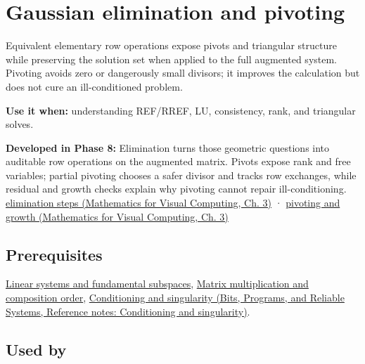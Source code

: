 \hypertarget{appendix-f6e77f4a200f}{}\label{referencestart:appendix-f6e77f4a200f}
\section{Gaussian elimination and pivoting}\label{appendix-f6e77f4a200f-gaussian-elimination-and-pivoting}

\hypertarget{appendix-f6e77f4a200f-gaussian-elimination-and-pivoting}{}

Equivalent elementary row operations expose pivots and triangular structure while preserving the solution set when applied to the full augmented system. Pivoting avoids zero or dangerously small divisors; it improves the calculation but does not cure an ill-conditioned problem.

\textbf{Use it when:} understanding REF/RREF, LU, consistency, rank, and triangular solves.

\textbf{Developed in Phase 8:} Elimination turns those geometric questions into auditable row operations on the augmented matrix. Pivots expose rank and free variables; partial pivoting chooses a safer divisor and tracks row exchanges, while residual and growth checks explain why pivoting cannot repair ill-conditioning. \href{../02-Mathematics-for-Visual-Computing/main.pdf\#nameddest=01-foundations-i-ch019-elimination-turns-the-geometry-into-an-auditable-calculation}{elimination steps (Mathematics for Visual Computing, Ch. 3)} · \href{../02-Mathematics-for-Visual-Computing/main.pdf\#nameddest=01-foundations-i-ch019-pivoting-separates-algorithm-failure-from-matrix-failure}{pivoting and growth (Mathematics for Visual Computing, Ch. 3)}

\subsection{Prerequisites}\label{appendix-f6e77f4a200f-prerequisites}

\hypertarget{appendix-f6e77f4a200f-prerequisites}{}

\hyperref[appendix-8572a4a060c1]{Linear systems and fundamental subspaces}, \hyperref[appendix-ab31ef447dbf]{Matrix multiplication and composition order}, \href{../01-Bits-Programs-and-Reliable-Systems/main.pdf\#nameddest=appendix-8f6a01f284a7}{Conditioning and singularity (Bits, Programs, and Reliable Systems, Reference notes: Conditioning and singularity)}.

\subsection{Used by}\label{appendix-f6e77f4a200f-used-by}

